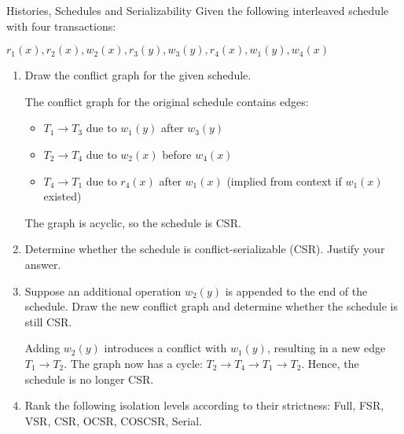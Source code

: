 \documentclass{article}
\begin{document}
\begin{exercise}{Histories, Schedules and Serializability}
  Given the following interleaved schedule with four transactions:
  \begin{center}$r_1(x), r_2(x), w_2(x), r_3(y), w_3(y), r_4(x), w_1(y), w_4(x)$\end{center}

  \begin{enumerate}
    \item Draw the conflict graph for the given schedule. \begin{solution}
        The conflict graph for the original schedule contains edges:
        \begin{itemize}
          \item $T_1 \rightarrow T_3$ due to $w_1(y)$ after $w_3(y)$
          \item $T_2 \rightarrow T_4$ due to $w_2(x)$ before $w_4(x)$
          \item $T_4 \rightarrow T_1$ due to $r_4(x)$ after $w_1(x)$ (implied from context if $w_1(x)$ existed)
        \end{itemize}
        The graph is acyclic, so the schedule is CSR.
      \end{solution}

    \item Determine whether the schedule is conflict-serializable (CSR). Justify your answer. 
    
    \item Suppose an additional operation $w_2(y)$ is appended to the end of the schedule. Draw the new conflict graph and determine whether the schedule is still CSR. \begin{solution}
        Adding $w_2(y)$ introduces a conflict with $w_1(y)$, resulting in a new edge $T_1 \rightarrow T_2$. The graph now has a cycle: $T_2 \rightarrow T_4 \rightarrow T_1 \rightarrow T_2$. Hence, the schedule is no longer CSR.
      \end{solution}

    \item Rank the following isolation levels according to their strictness: Full, FSR, VSR, CSR, OCSR, COSCSR, Serial. 
  \end{enumerate}
\end{exercise}
\end{document}
